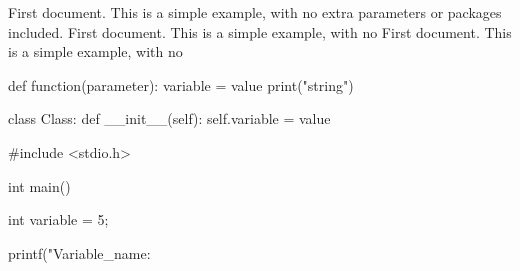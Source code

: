 \documentclass{SimpleLatex}
\begin{document}
\tableofcontents
First document. This is a simple example, with no 
extra parameters or packages included.
First document. This is a simple example, with no 
First document. This is a simple example, with no 

\pagebreak


\begin{CodeBlockPython}[10]
def function(parameter):
    variable = value
    print("string")

class Class:
    def __init__(self):
        self.variable = value
        
\end{CodeBlockPython}

\begin{CodeBlockC}[5]
#include <stdio.h>

int main() {
    int variable = 5;

    printf("Variable_name: %
}
\end{CodeBlockC}

\end{document}
